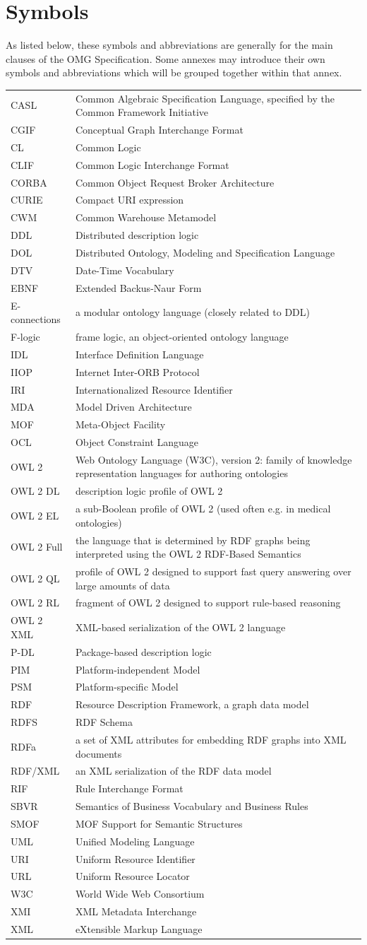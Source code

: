 \documentclass[10pt,%
\ifpretendfinal
final%
\else
draft%
\fi,
]{scrreprt}
\makeatletter
\newcommand*{\eg}{e.g.\@\xspace}
\newcommand*{\IS}{OMG Specification\xspace}
\newenvironment{symbols}[0]{\begin{longtable}{p{.15\textwidth}p{.84\textwidth}}}{\end{longtable}}
\newcommand{\symboldef}[2]{ #1 & #2 \\}
\makeatother
\begin{document}
\chapter{Symbols}

As listed below, these symbols and abbreviations are generally for the main clauses of the \IS. Some annexes may introduce their own symbols and abbreviations which will be grouped together within that annex.

\begin{symbols}
\symboldef{CASL}{Common Algebraic Specification Language, specified by the Common Framework Initiative}
\symboldef{CGIF}{Conceptual Graph Interchange Format}
\symboldef{CL}{Common Logic }
\symboldef{CLIF}{Common Logic Interchange Format}
\symboldef{CORBA}{Common Object Request Broker Architecture}
\symboldef{CURIE}{Compact URI expression}
\symboldef{CWM}{Common Warehouse Metamodel}
\symboldef{DDL}{Distributed description logic}
\symboldef{DOL}{Distributed Ontology, Modeling and Specification Language}
\symboldef{DTV}{Date-Time Vocabulary}
\symboldef{EBNF}{Extended Backus-Naur Form}
\symboldef{E-connections}{a modular ontology language (closely related to DDL)}
\symboldef{F-logic}{frame logic, an object-oriented ontology language}
\symboldef{IDL}{Interface Definition Language}
\symboldef{IIOP}{Internet Inter-ORB Protocol}
\symboldef{IRI}{Internationalized Resource Identifier}
\symboldef{MDA}{Model Driven Architecture}
\symboldef{MOF}{Meta-Object Facility}
\symboldef{OCL}{Object Constraint Language}
\symboldef{OWL 2}{Web Ontology Language (W3C), version 2: family of knowledge representation languages for authoring ontologies}
\symboldef{OWL 2 DL}{description logic profile of OWL 2}
\symboldef{OWL 2 EL}{a sub-Boolean profile of OWL 2 (used often \eg in medical ontologies)}
\symboldef{OWL 2 Full}{the language that is determined by RDF graphs being interpreted 
using the OWL 2 RDF-Based Semantics \cite{W3C:REC-owl2-rdf-based-semantics-20091027}}
\symboldef{OWL 2 QL}{profile of OWL 2 designed to support fast query answering over large amounts of data}
\symboldef{OWL 2 RL}{fragment of OWL 2 designed to support rule-based reasoning}
\symboldef{OWL 2 XML}{XML-based serialization of the OWL 2 language}
\symboldef{P-DL}{Package-based description logic}
\symboldef{PIM}{Platform-independent Model}
\symboldef{PSM}{Platform-specific Model}
\symboldef{RDF}{Resource Description Framework, a graph data model}
\symboldef{RDFS}{RDF Schema}
\symboldef{RDFa}{a set of XML attributes for embedding RDF graphs into XML documents}
\symboldef{RDF/XML}{an XML serialization of the RDF data model}
\symboldef{RIF}{Rule Interchange Format}
\symboldef{SBVR}{Semantics of Business Vocabulary and Business Rules}
\symboldef{SMOF}{MOF Support for Semantic Structures}
\symboldef{UML}{Unified Modeling Language}
\symboldef{URI}{Uniform Resource Identifier}
\symboldef{URL}{Uniform Resource Locator}
\symboldef{W3C}{World Wide Web Consortium}
\symboldef{XMI}{XML Metadata Interchange}
\symboldef{XML}{eXtensible Markup Language}
\end{symbols}
\end{document}
